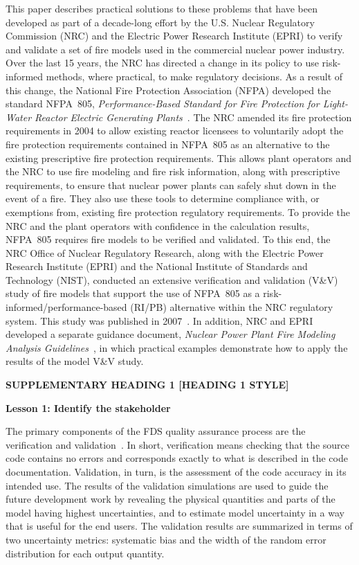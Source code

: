 \documentclass[fleqn,b5paper]{article}
\begin{document}
This paper describes practical solutions to these problems that have been developed as part of a decade-long effort by the U.S. Nuclear Regulatory Commission (NRC) and the Electric Power Research Institute (EPRI) to verify and validate a set of fire models used in the commercial nuclear power industry. Over the last 15 years, the NRC has directed a change in its policy to use risk-informed methods, where practical, to make regulatory decisions.  As a result of this change, the National Fire Protection Association (NFPA) developed the standard NFPA~805, {\em Performance-Based Standard for Fire Protection for Light-Water Reactor Electric Generating Plants}~\cite{NFPA_805}.  The NRC amended its fire protection requirements in 2004 to allow existing reactor licensees to voluntarily adopt the fire protection requirements contained in NFPA~805 as an alternative to the existing prescriptive fire protection requirements. This allows plant operators and the NRC to use fire modeling and fire risk information, along with prescriptive requirements, to ensure that nuclear power plants can safely shut down in the event of a fire. They also use these tools to determine compliance with, or exemptions from, existing fire protection regulatory requirements. To provide the NRC and the plant operators with confidence in the calculation results, NFPA~805 requires fire models to be verified and validated.  To this end, the NRC Office of Nuclear Regulatory Research, along with the Electric Power Research Institute (EPRI) and the National Institute of Standards and Technology (NIST), conducted an extensive verification and validation (V\&V) study of fire models that support the use of NFPA~805 as a risk-informed/performance-based (RI/PB) alternative within the NRC regulatory system. This study was published in 2007~\cite{NUREG_1824}. In addition, NRC and EPRI developed a separate guidance document, {\em Nuclear Power Plant Fire Modeling Analysis Guidelines}~\cite{NUREG_1934}, in which practical examples demonstrate how to apply the results of the model V\&V study.


\vspace{\parskip}
{\bf SUPPLEMENTARY HEADING 1 [HEADING 1 STYLE]}


\vspace{\parskip}
{\bf Lesson 1: Identify the stakeholder}



The primary components of the FDS quality assurance process are the verification and validation~\cite{ASTM:E1355}. In short, verification means checking that the source code contains no errors and corresponds exactly to what is described in the code documentation. Validation, in turn, is the assessment of the code accuracy in its intended use. The results of the validation simulations are used to guide the future development work by revealing the physical quantities and parts of the model having highest uncertainties, and to estimate model uncertainty in a way that is useful for the end users. The validation results are summarized in terms of two uncertainty metrics: systematic bias and the width of the random error distribution for each output quantity.
\end{document}
